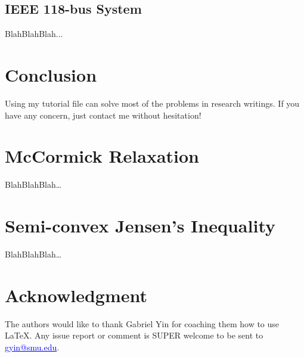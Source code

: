 \documentclass[journal]{IEEEtran}
\begin{document}
\subsection{IEEE 118-bus System}
BlahBlahBlah...

\section{Conclusion}
Using my tutorial file can solve most of the problems in research writings. If you have any concern, just contact me without hesitation!

\appendices
\section{McCormick Relaxation}
BlahBlahBlah\dots
\section{Semi-convex Jensen's Inequality}
BlahBlahBlah\dots
\section*{Acknowledgment}
The authors would like to thank Gabriel Yin for coaching them how to use \LaTeX. Any issue report or comment is SUPER welcome to be sent to \textcolor{blue}{\underline{gyin@smu.edu}}.

\ifCLASSOPTIONcaptionsoff
  \newpage
\fi

%          
% 

\end{document}
